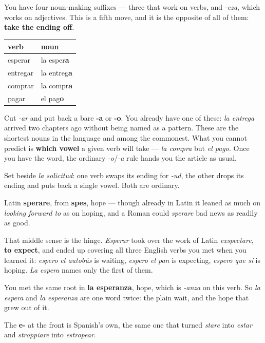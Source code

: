 \begin{grammarlens}[title={Grammar Lens: a noun made by cutting, not by adding}]
You have four noun-making suffixes — three that work on verbs, and \emph{-eza}, which works on adjectives. This is a fifth move, and it is the opposite of all of them: \textbf{take the ending off}.

\noindent
\begin{tabularx}{\linewidth}{@{}>{\raggedright\arraybackslash}X>{\raggedright\arraybackslash}X@{}}
\toprule
\textbf{verb} & \textbf{noun} \\
\midrule
esperar & la esper\textbf{a} \\
entregar & la entreg\textbf{a} \\
comprar & la compr\textbf{a} \\
pagar & el pag\textbf{o} \\
\bottomrule
\end{tabularx}

Cut \emph{-ar} and put back a bare \textbf{-a} or \textbf{-o}. You already have one of these: \emph{la entrega} arrived two chapters ago without being named as a pattern. These are the shortest nouns in the language and among the commonest. What you cannot predict is \textbf{which vowel} a given verb will take — \emph{la compra} but \emph{el pago}. Once you have the word, the ordinary \emph{-o}/\emph{-a} rule hands you the article as usual.

Set beside \emph{la solicitud}: one verb swaps its ending for \emph{-ud}, the other drops its ending and puts back a single vowel. Both are ordinary.
\end{grammarlens}

\begin{cousinweb}
Latin \textbf{sperare}, from \textbf{spes}, hope — though already in Latin it leaned as much on \emph{looking forward to} as on hoping, and a Roman could \emph{sperare} bad news as readily as good.

That middle sense is the hinge. \emph{Esperar} took over the work of Latin \emph{exspectare}, \textbf{to expect}, and ended up covering all three English verbs you met when you learned it: \emph{espero el autobús} is waiting, \emph{espero el pan} is expecting, \emph{espero que sí} is hoping. \emph{La espera} names only the first of them.

You met the same root in \textbf{la esperanza}, hope, which is \emph{-anza} on this verb. So \emph{la espera} and \emph{la esperanza} are one word twice: the plain wait, and the hope that grew out of it.

The \textbf{e-} at the front is Spanish's own, the same one that turned \emph{stare} into \emph{estar} and \emph{stroppiare} into \emph{estropear}.
\end{cousinweb}

